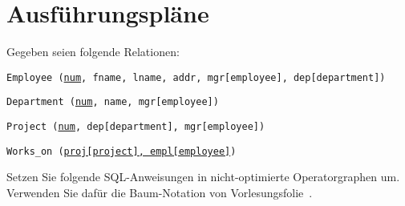 \section{Ausführungspläne}
\label{plan}

Gegeben seien folgende Relationen:

\texttt{Employee (\underline{num}, fname, lname, addr, mgr[employee], \beamertxt{\\}dep[department])}

\texttt{Department (\underline{num}, name, mgr[employee])}

\texttt{Project (\underline{num}, dep[department], mgr[employee])}

\texttt{Works\_on (\underline{proj[project], empl[employee]})}

Setzen Sie folgende SQL-Anweisungen in nicht-optimierte Operatorgraphen um. Verwenden Sie dafür die Baum-Notation von Vorlesungsfolie~\Operatorgraph. %

